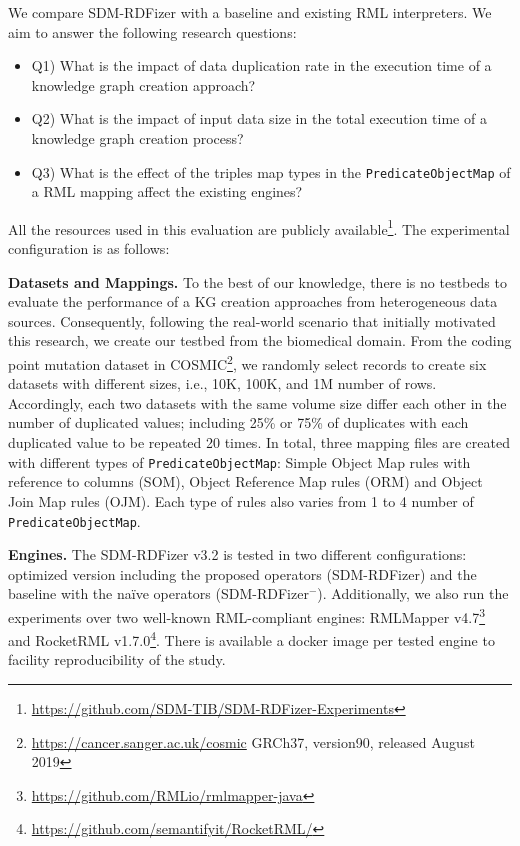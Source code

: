 We compare SDM-RDFizer with a baseline and existing RML interpreters. We aim to answer the following research questions:
\begin{itemize}
\item Q1) What is the impact of data duplication rate in the execution time of a knowledge graph creation approach?
\item Q2) What is the impact of input data size in the total execution time of a knowledge graph creation process?
\item Q3) What is the effect of the triples map types in the \verb|PredicateObjectMap| of a RML mapping affect the existing engines?
\end{itemize}
All the resources used in this evaluation are publicly available\footnote{\url{https://github.com/SDM-TIB/SDM-RDFizer-Experiments}}. The experimental configuration is as follows:

\noindent\textbf{Datasets and Mappings.} To the best of our knowledge, there is no testbeds to evaluate the performance of a KG creation approaches from heterogeneous data sources. Consequently, following the real-world scenario that initially motivated this research, we create our testbed from the biomedical domain. From the coding point mutation dataset in COSMIC\footnote{\url{https://cancer.sanger.ac.uk/cosmic} GRCh37, version90, released August 2019}, we randomly select records to create six datasets with different sizes, i.e., 10K, 100K, and 1M number of rows. Accordingly, each two datasets with the same volume size differ each other in the number of duplicated values; including 25\% or 75\% of duplicates with each duplicated value to be repeated 20 times. In total, three mapping files are created with different types of \verb|PredicateObjectMap|: Simple Object Map rules with reference to columns (SOM), Object Reference Map rules (ORM) and Object Join Map rules (OJM). Each type of rules also varies from 1 to 4 number of \verb|PredicateObjectMap|.

\noindent\textbf{Engines.} The SDM-RDFizer v3.2 is tested in two different configurations: optimized version including the proposed operators (SDM-RDFizer) and the baseline with the na\"ive operators (SDM-RDFizer$^-$). Additionally, we also run the experiments over two well-known RML-compliant engines: RMLMapper v4.7\footnote{\url{https://github.com/RMLio/rmlmapper-java}} and RocketRML v1.7.0\footnote{\url{https://github.com/semantifyit/RocketRML/}}. There is available a docker image per tested engine to facility reproducibility of the study.

